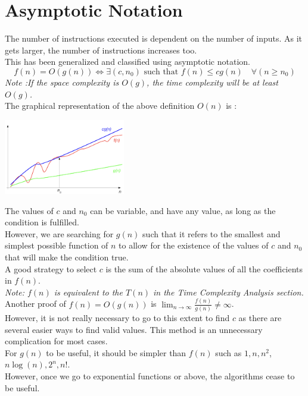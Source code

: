 \documentclass[nobib]{tufte-handout}
\begin{document}
\section{Asymptotic Notation}
The number of instructions executed is dependent on the number of inputs. As it
gets larger, the number of instructions increases too.\\ This has been
generalized and classified using asymptotic notation.
\begin{equation*}
    f(n) = O(g(n)) \iff \exists (c,n_0) \text{ such that }f(n)\leq cg(n) \quad \forall (n \geq n_0)
\end{equation*}
\textit{Note :If the space complexity is $O(g)$, the time complexity will be at least $O(g)$.\\}
The graphical representation of the above definition $O(n)$ is :
\begin{center}
    \includegraphics[width = 200px]{images/complexity_graph.png}
\end{center}
The values of $c$ and $n_0$ can be variable, and have any value, as long as the condition is fulfilled.\\
However, we are searching for $g(n)$ such that it refers to the smallest and simplest possible function of $n$ to allow for the existence of the values of $c$ and $n_0$ that will make the condition true.\\
A good strategy to select $c$ is the sum of the absolute values of all the coefficients in $f(n)$.\\
\textit{Note: $f(n)$ is equivalent to the $T(n)$ in the Time Complexity Analysis section.}\\
Another proof of $f(n)=O(g(n))$ is $\lim_{n \rightarrow \infty}\frac{f(n)}{g(n)}\neq \infty$.\\
However, it is not really necessary to go to this extent to find $c$ as there are several easier ways to find valid values. This method is an unnecessary complication for most cases.\\
For $g(n)$ to be useful, it should be simpler than $f(n)$ such as $1,n,n^2$, $n\log(n), 2^n, n!$.\\
However, once we go to exponential functions or above, the algorithms cease to be useful.\\
\end{document}
